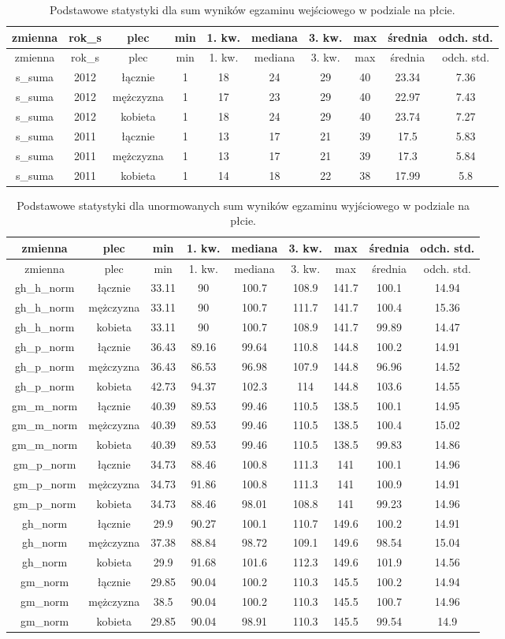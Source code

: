 \documentclass[]{article}
\begin{document}
\begin{longtable}[c]{@{}cccccccccc@{}}
\caption{Podstawowe statystyki dla sum wyników egzaminu wejściowego w
podziale na płcie.}\tabularnewline
\toprule
zmienna & rok\_s & plec & min & 1. kw. & mediana & 3. kw. & max &
średnia & odch. std.\tabularnewline
\midrule
\endfirsthead
\toprule
zmienna & rok\_s & plec & min & 1. kw. & mediana & 3. kw. & max &
średnia & odch. std.\tabularnewline
\midrule
\endhead
s\_suma & 2012 & łącznie & 1 & 18 & 24 & 29 & 40 & 23.34 &
7.36\tabularnewline
s\_suma & 2012 & mężczyzna & 1 & 17 & 23 & 29 & 40 & 22.97 &
7.43\tabularnewline
s\_suma & 2012 & kobieta & 1 & 18 & 24 & 29 & 40 & 23.74 &
7.27\tabularnewline
s\_suma & 2011 & łącznie & 1 & 13 & 17 & 21 & 39 & 17.5 &
5.83\tabularnewline
s\_suma & 2011 & mężczyzna & 1 & 13 & 17 & 21 & 39 & 17.3 &
5.84\tabularnewline
s\_suma & 2011 & kobieta & 1 & 14 & 18 & 22 & 38 & 17.99 &
5.8\tabularnewline
\bottomrule
\end{longtable}

\begin{longtable}[c]{@{}ccccccccc@{}}
\caption{Podstawowe statystyki dla unormowanych sum wyników egzaminu
wyjściowego w podziale na płcie.}\tabularnewline
\toprule
zmienna & plec & min & 1. kw. & mediana & 3. kw. & max & średnia & odch.
std.\tabularnewline
\midrule
\endfirsthead
\toprule
zmienna & plec & min & 1. kw. & mediana & 3. kw. & max & średnia & odch.
std.\tabularnewline
\midrule
\endhead
gh\_h\_norm & łącznie & 33.11 & 90 & 100.7 & 108.9 & 141.7 & 100.1 &
14.94\tabularnewline
gh\_h\_norm & mężczyzna & 33.11 & 90 & 100.7 & 111.7 & 141.7 & 100.4 &
15.36\tabularnewline
gh\_h\_norm & kobieta & 33.11 & 90 & 100.7 & 108.9 & 141.7 & 99.89 &
14.47\tabularnewline
gh\_p\_norm & łącznie & 36.43 & 89.16 & 99.64 & 110.8 & 144.8 & 100.2 &
14.91\tabularnewline
gh\_p\_norm & mężczyzna & 36.43 & 86.53 & 96.98 & 107.9 & 144.8 & 96.96
& 14.52\tabularnewline
gh\_p\_norm & kobieta & 42.73 & 94.37 & 102.3 & 114 & 144.8 & 103.6 &
14.55\tabularnewline
gm\_m\_norm & łącznie & 40.39 & 89.53 & 99.46 & 110.5 & 138.5 & 100.1 &
14.95\tabularnewline
gm\_m\_norm & mężczyzna & 40.39 & 89.53 & 99.46 & 110.5 & 138.5 & 100.4
& 15.02\tabularnewline
gm\_m\_norm & kobieta & 40.39 & 89.53 & 99.46 & 110.5 & 138.5 & 99.83 &
14.86\tabularnewline
gm\_p\_norm & łącznie & 34.73 & 88.46 & 100.8 & 111.3 & 141 & 100.1 &
14.96\tabularnewline
gm\_p\_norm & mężczyzna & 34.73 & 91.86 & 100.8 & 111.3 & 141 & 100.9 &
14.91\tabularnewline
gm\_p\_norm & kobieta & 34.73 & 88.46 & 98.01 & 108.8 & 141 & 99.23 &
14.96\tabularnewline
gh\_norm & łącznie & 29.9 & 90.27 & 100.1 & 110.7 & 149.6 & 100.2 &
14.91\tabularnewline
gh\_norm & mężczyzna & 37.38 & 88.84 & 98.72 & 109.1 & 149.6 & 98.54 &
15.04\tabularnewline
gh\_norm & kobieta & 29.9 & 91.68 & 101.6 & 112.3 & 149.6 & 101.9 &
14.56\tabularnewline
gm\_norm & łącznie & 29.85 & 90.04 & 100.2 & 110.3 & 145.5 & 100.2 &
14.94\tabularnewline
gm\_norm & mężczyzna & 38.5 & 90.04 & 100.2 & 110.3 & 145.5 & 100.7 &
14.96\tabularnewline
gm\_norm & kobieta & 29.85 & 90.04 & 98.91 & 110.3 & 145.5 & 99.54 &
14.9\tabularnewline
\bottomrule
\end{longtable}
\end{document}
